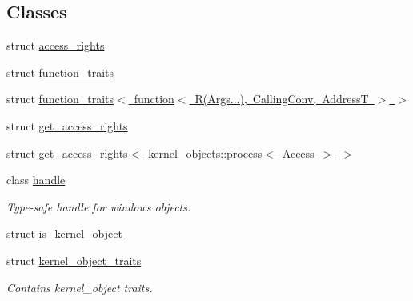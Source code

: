 \subsection*{Classes}
\begin{DoxyCompactItemize}
\item 
struct \mbox{\hyperlink{structdistant_1_1access__rights}{access\+\_\+rights}}
\item 
struct \mbox{\hyperlink{structdistant_1_1function__traits}{function\+\_\+traits}}
\item 
struct \mbox{\hyperlink{structdistant_1_1function__traits_3_01function_3_01_r_07_args_8_8_8_08_00_01_calling_conv_00_01_address_t_01_4_01_4}{function\+\_\+traits$<$ function$<$ R(\+Args...), Calling\+Conv, Address\+T $>$ $>$}}
\item 
struct \mbox{\hyperlink{structdistant_1_1get__access__rights}{get\+\_\+access\+\_\+rights}}
\item 
struct \mbox{\hyperlink{structdistant_1_1get__access__rights_3_01kernel__objects_1_1process_3_01_access_01_4_01_4}{get\+\_\+access\+\_\+rights$<$ kernel\+\_\+objects\+::process$<$ Access $>$ $>$}}
\item 
class \mbox{\hyperlink{classdistant_1_1handle}{handle}}
\begin{DoxyCompactList}\small\item\em Type-\/safe handle for windows objects. \end{DoxyCompactList}\item 
struct \mbox{\hyperlink{structdistant_1_1is__kernel__object}{is\+\_\+kernel\+\_\+object}}
\item 
struct \mbox{\hyperlink{structdistant_1_1kernel__object__traits}{kernel\+\_\+object\+\_\+traits}}
\begin{DoxyCompactList}\small\item\em Contains kernel\+\_\+object traits. \end{DoxyCompactList}\end{DoxyCompactItemize}
